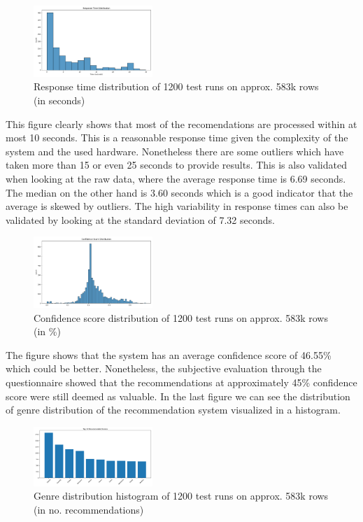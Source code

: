 \documentclass[12pt,a4paper]{article}
\begin{document}
\begin{figure}[H]
  \centering
  \includegraphics[width=0.4\textwidth]{../assets/response_time_dist.png}
  \caption{Response time distribution of 1200 test runs on approx. 583k rows (in seconds)}
\end{figure}

\noindent This figure clearly shows that most of the recomendations are processed within at most 10 seconds.
This is a reasonable response time given the complexity of the system and the used hardware.
Nonetheless there are some outliers which have taken more than 15 or even 25 seconds to provide results.
This is also validated when looking at the raw data, where the average response time is 6.69 seconds.
The median on the other hand is 3.60 seconds which is a good indicator that the average is skewed by outliers.
The high variability in response times can also be validated by looking at the standard deviation of 7.32 seconds.

\begin{figure}[H]
  \centering
  \includegraphics[width=0.4\textwidth]{../assets/confidence_dist.png}
  \caption{Confidence score distribution of 1200 test runs on approx. 583k rows (in \%)}
\end{figure}

\noindent The figure shows that the system has an average confidence score of 46.55\% which could be better.
Nonetheless, the subjective evaluation through the questionnaire showed that the recommendations at approximately 45\% confidence score were still deemed as valuable.
In the last figure we can see the distribution of genre distribution of the recommendation system visualized in a histogram.

\begin{figure}[H]
  \centering
  \includegraphics[width=0.4\textwidth]{../assets/top_genres.png}
  \caption{Genre distribution histogram of 1200 test runs on approx. 583k rows (in no. recommendations)}
\end{figure}
\end{document}
